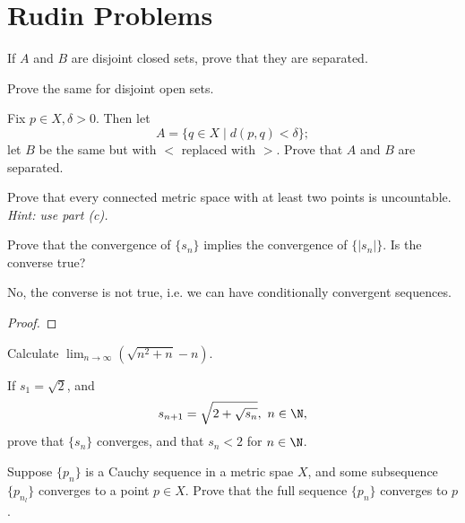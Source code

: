 \documentclass{assignment}
\begin{document}
\maketitle

\section*{Rudin Problems}
\begin{question}[2.19]
  \begin{qparts}
   \item If $A$ and $B$ are disjoint closed sets, prove that they are separated.
   \item Prove the same for disjoint open sets.
   \item Fix $p\in X, \delta > 0.$ Then let $$A = \{q\in X \mid d(p,q) < \delta\};$$ let $B$ be the 
   same but with $<$ replaced with $>$. Prove that $A$ and $B$ are separated.
   \item Prove that every connected metric space with at least two points is uncountable. \emph{Hint:
   use part (c).}
  \end{qparts} 
\end{question}

\begin{question}[3.1]
  Prove that the convergence of $\{s_n\}$ implies the convergence of $\{|s_n|\}$. Is the converse
  true?
\end{question}
No, the converse is not true, i.e. we can have conditionally convergent sequences.
\begin{proof}
  
\end{proof}

\begin{question}[3.2]
  Calculate $\lim_{n\to\infty}(\sqrt{n^2 + n} - n)$.
\end{question}

\begin{question}[3.3]
  If $s_1 = \sqrt{2}$, and $$s_{n+1} = \sqrt{2 + \sqrt{s_n}},\ n\in\N,$$ prove that $\{s_n\}$ converges,
  and that $s_n < 2$ for $n\in\N$.
\end{question}

\begin{question}[3.20]
  Suppose $\{p_n\}$ is a Cauchy sequence in a metric spae $X$, and some subsequence $\{p_{n_l}\}$ 
  converges to a point $p\in X$. Prove that the full sequence $\{p_n\}$ converges to $p$.
\end{question}
\end{document}
